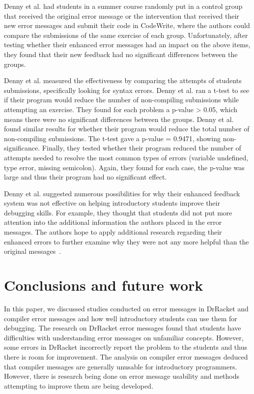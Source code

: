 \documentclass{sig-alternate}
\begin{document}
Denny et al. had students in a summer course randomly put in a control group that received the original error message or the intervention that received their new error messages and submit their code in CodeWrite, where the authors could compare the submissions of the same exercise of each group.
Unfortunately, after testing whether their enhanced error messages had an impact on the above items, they found that their new feedback had no significant differences between the groups.

Denny et al. measured the effectiveness by comparing the attempts of students submissions, specifically looking for syntax errors.
Denny et al. ran a t-test to see if their program would reduce the number of non-compiling submissions while attempting an exercise.
They found for each problem a p-value > 0.05, which means there were no significant differences between the groups.
Denny et al. found similar results for whether their program would reduce the total number of non-compiling submissions.
The t-test gave a p-value = 0.9471, showing non-significance.
Finally, they tested whether their program reduced the number of attempts needed to resolve the most common types of errors (variable undefined, type error, missing semicolon).
Again, they found for each case, the p-value was large and thus their program had no significant effect.

Denny et al. suggested numerous possibilities for why their enhanced feedback system was not effective on helping introductory students improve their debugging skills.
For example, they thought that students did not put more attention into the additional information the authors placed in the error messages.
The authors hope to apply additional research regarding their enhanced errors to further examine why they were not any more helpful than the original messages~\cite{Denny:2014:ESE:2591708.2591748}.


\section{Conclusions and future work}\label{sec:concl}

In this paper, we discussed studies conducted on error messages in DrRacket and compiler error messages and how well introductory students can use them for debugging.
The research on DrRacket error messages found that students have difficulties with understanding error messages on unfamiliar concepts.
However, some errors in DrRacket incorrectly report the problem to the students and thus there is room for improvement.
The analysis on compiler error messages deduced that compiler messages are generally unusable for introductory programmers.
However, there is research being done on error message usability and methods attempting to improve them are being developed.
\end{document}
